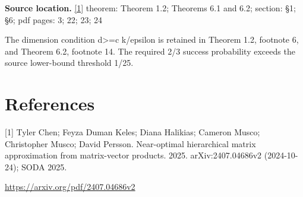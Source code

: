 \documentclass[10pt,a4paper]{article}
\begin{document}
\textbf{Source location.} \href{https://arxiv.org/pdf/2407.04686v2}{[1]} theorem: Theorem 1.2; Theorems 6.1 and 6.2; section: §1; §6; pdf pages: 3; 22; 23; 24

The dimension condition d>=c k/epsilon is retained in Theorem 1.2, footnote 6, and Theorem 6.2, footnote 14. The required 2/3 success probability exceeds the source lower-bound threshold 1/25.

\section{References}
[1] Tyler Chen; Feyza Duman Keles; Diana Halikias; Cameron Musco; Christopher Musco; David Persson. Near-optimal hierarchical matrix approximation from matrix-vector products. 2025. arXiv:2407.04686v2 (2024-10-24); SODA 2025.

\url{https://arxiv.org/pdf/2407.04686v2}
\end{document}
